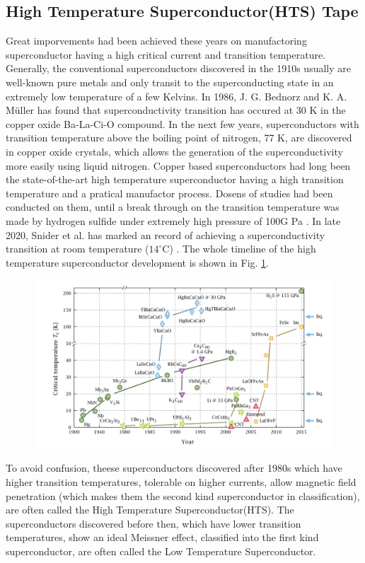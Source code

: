 \subsection{High Temperature Superconductor(HTS) Tape}
Great imporvements had been achieved these years on manufactoring superconductor having a high critical current and transition temperature.
Generally, the conventional superconductors discovered in the 1910s usually are well-known pure metals and only transit to the superconducting state in an extremely low temperature of a few Kelvins.
In 1986, J. G. Bednorz and K. A. Müller has found that superconductivity transition has occured at 30 K in the copper oxide Ba-La-Ci-O compound.
In the next few years, superconductors with transition temperature above the boiling point of nitrogen, 77 K,
are discovered in copper oxide crystals,
which allows the generation of the superconductivity more easily using liquid nitrogen.
Copper based superconductors had long been the state-of-the-art high temperature superconductor having a high transition temperature and a pratical manufactor process.
Dosens of studies had been conducted on them, until a break through on the transition temperature was made by hydrogen sulfide under extremely high pressure of 100G Pa \cite{2_8}.
In late 2020, Snider et al. has marked an record of achieving a superconductivity transition at room temperature ($14^\circ \mathrm{C}$) \cite{2_9}.
The whole timeline of the high temperature superconductor development is shown in Fig. \ref{fig:HTSs}.
\begin{figure}[H]
  \includegraphics[width=18.5cm, bb=9 9 900 500]{./section2Proposal/HTSs.png}
  \caption{}
  \label{fig:HTSs}
\end{figure}

To avoid confusion, theese superconductors discovered after 1980s which have higher transition temperatures, tolerable on higher currents,
allow magnetic field penetration (which makes them the second kind superconductor in classification),
are often called the High Temperature Superconductor(HTS).
The superconductors discovered before then,
which have lower transition temperatures, show an ideal Meissner effect, classified into the first kind superconductor, are often called the Low Temperature Superconductor.

